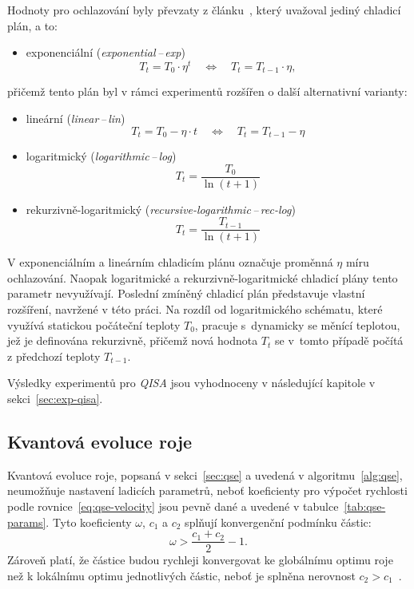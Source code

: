 Hodnoty pro ochlazování byly převzaty z článku~\cite{qisa}, který uvažoval jediný chladicí plán, a to:
\begin{itemize}
    \item exponenciální (\emph{exponential\,--\,exp})~\cite{qisa,sa-cooling}
    \begin{equation}\label{eq:qisa-exp}
        T_t = T_0 \cdot \eta^t \quad\Longleftrightarrow\quad T_t = T_{t-1} \cdot \eta,
    \end{equation}
\end{itemize}
přičemž tento plán byl v rámci experimentů rozšířen o další alternativní varianty:
\begin{itemize}
    \item lineární (\emph{linear\,--\,lin})~\cite{sa-cooling}
    \begin{equation}\label{eq:qisa-lin}
        T_t = T_0 - \eta \cdot t \quad\Longleftrightarrow\quad T_t = T_{t-1} - \eta
    \end{equation}
    \item logaritmický (\emph{logarithmic\,--\,log})~\cite{metaheuristics,sa-cooling, banchs_simulated_annealing}
    \begin{equation}\label{eq:qisa-log}
        T_t = \frac{T_0}{\ln\left(t+1\right)}
    \end{equation}
    \item rekurzivně-logaritmický (\emph{recursive-logarithmic\,--\,rec-log})
    \begin{equation}\label{eq:qisa-rec-log}
        T_t = \frac{T_{t-1}}{\ln\left(t+1\right)}
    \end{equation}
\end{itemize}
V exponenciálním a lineárním chladicím plánu označuje proměnná $\eta$ míru ochlazování. 
Naopak logaritmické a rekurzivně-logaritmické chladicí plány tento parametr nevyužívají. 
Poslední zmíněný chladicí plán představuje vlastní rozšíření, navržené v této práci. 
Na rozdíl od logaritmického schématu, které využívá statickou počáteční teploty $T_0$, pracuje s~dynamicky se měnící teplotou, jež je definována rekurzivně, přičemž nová hodnota $T_t$ se v~tomto případě počítá z předchozí teploty $T_{t-1}$.

Výsledky experimentů pro \emph{QISA} jsou vyhodnoceny v následující kapitole v sekci~\ref{sec:exp-qisa}.

\subsection*{Kvantová evoluce roje}
Kvantová evoluce roje, popsaná v sekci~\ref{sec:qse} a uvedená v algoritmu~\ref{alg:qse}, neumožňuje nastavení ladicích parametrů, neboť koeficienty pro výpočet rychlosti podle rovnice~\ref{eq:qse-velocity} jsou pevně dané a uvedené v tabulce~\ref{tab:qse-params}.
Tyto koeficienty $\omega$, $c_1$ a $c_2$ splňují konvergenční podmínku částic:
\begin{equation*}
    \omega > \frac{c_1 + c_2}{2} - 1.
\end{equation*}
Zároveň platí, že částice budou rychleji konvergovat ke globálnímu optimu roje než k lokálnímu optimu jednotlivých částic, neboť je splněna nerovnost $c_2 > c_1$~\cite{qse}. 

